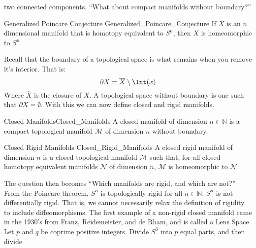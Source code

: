 \documentclass[crop=false,class=book,oneside]{standalone}                      %
\begin{document}
            two connected components. ``What about compact manifolds without
            boundary?''
            \begin{ltheorem}{Generalized Poincare Conjecture}
                            {Generalized_Poincare_Conjecture}
                If $X$ is an $n$ dimensional manifold that
                is homotopy equivalent to $S^{n}$, then $X$
                is homeomorphic to $S^{n}$.
            \end{ltheorem}
            \vspace{5pt}
            Recall that the boundary of a topological space
            is what remains when you remove it's interior.
            That is:
            \begin{equation}
                \partial{X}=\overline{X}\setminus\Int(x)
            \end{equation}
            Where $\overline{X}$ is the closure of $X$.
            A topological space without boundary is one such that
            $\partial{X}=\emptyset$. With this we can now define
            closed and rigid manifolds.
            \begin{ldefinition}{Closed Manifolds}{Closed_Manifolds}
                A closed manifold of dimension $n\in\mathbb{N}$ is
                a compact topological manifold $\mathcal{M}$ of
                dimension $n$ without boundary.
            \end{ldefinition}
            \begin{ldefinition}{Closed Rigid Manifolds}
                               {Closed_Rigid_Manifolds}
                A closed rigid manifold of dimension $n$
                is a closed topological manifold $\mathcal{M}$
                such that, for all closed homotopy equivalent
                manifolds $\mathcal{N}$ of dimension $n$,
                $\mathcal{M}$ is homeomorphic to $\mathcal{N}$.
            \end{ldefinition}
            The question then becomes
            ``Which manifolds are rigid, and which are not?''
            From the Poincare theorem, $S^{n}$ is topologically
            rigid for all $n\in\mathbb{N}$. $S^{n}$ is not differentially
            rigid. That is, we cannot necessarily relax the definition
            of rigidity to include diffeomorphisms.
            The first example of a non-rigid closed
            manifold came in the 1930's from Franz, Reidemeister,
            and de Rham, and is called a Lens Space.
            Let $p$ and $q$ be coprime positive integers.
            Divide $S^{3}$ into $p$ equal parts, and then divide
\end{document}
